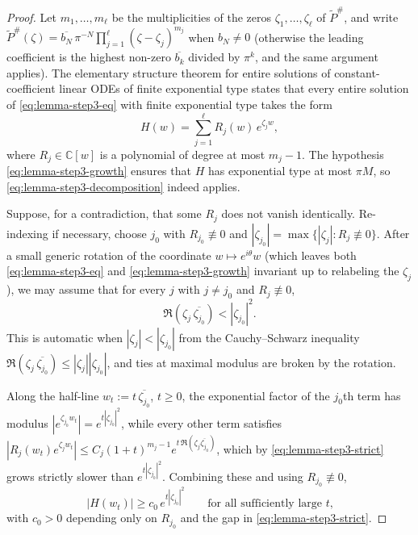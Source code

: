 \documentclass[a4paper,11pt,reqno]{amsart}
\numberwithin{equation}{section}
\theoremstyle{plain} %
\theoremstyle{definition} %
\theoremstyle{remark}
\newcommand{\C}{\mathbb{C}}
\begin{document}
\begin{proof}
Let $m_1,\dots,m_\ell$ be the multiplicities of the zeros
$\zeta_1,\dots,\zeta_\ell$ of $\widetilde P^\#$, and write
\(\widetilde P^\#(\zeta)=\overline{b_N}\,\pi^{-N}\prod_{j=1}^\ell(\zeta-\zeta_j)^{m_j}\)
when $b_N\neq0$ (otherwise the leading coefficient is the highest non-zero
$\overline{b_k}$ divided by $\pi^k$, and the same argument applies). The
elementary structure theorem for entire solutions of constant-coefficient
linear ODEs of finite exponential type \cite[Ch.~XII]{Hormander-PDE2} states that
every entire solution of \eqref{eq:lemma-step3-eq} with finite exponential
type takes the form
\begin{equation}\label{eq:lemma-step3-decomposition}
H(w)=\sum_{j=1}^\ell R_j(w)\,e^{\zeta_j w},
\end{equation}
where \(R_j\in\C[w]\) is a polynomial of degree at most \(m_j-1\). The
hypothesis \eqref{eq:lemma-step3-growth} ensures that \(H\) has exponential
type at most \(\pi M\), so \eqref{eq:lemma-step3-decomposition} indeed
applies.

Suppose, for a contradiction, that some $R_j$ does not vanish identically.
Re-indexing if necessary, choose $j_0$ with $R_{j_0}\not\equiv0$ and
$|\zeta_{j_0}|=\max\{|\zeta_j|\colon R_j\not\equiv 0\}$. After a small
generic rotation of the coordinate $w\mapsto e^{i\theta}w$ (which leaves both
\eqref{eq:lemma-step3-eq} and \eqref{eq:lemma-step3-growth} invariant up to
relabeling the $\zeta_j$), we may assume that for every \(j\) with
$j\ne j_0$ and $R_j\not\equiv 0$,
\begin{equation}\label{eq:lemma-step3-strict}
\Re(\zeta_j\,\overline{\zeta_{j_0}})<|\zeta_{j_0}|^2.
\end{equation}
This is automatic when $|\zeta_j|<|\zeta_{j_0}|$ from the Cauchy--Schwarz
inequality $\Re(\zeta_j\,\overline{\zeta_{j_0}})\le|\zeta_j||\zeta_{j_0}|$,
and ties at maximal modulus are broken by the rotation.

Along the half-line \(w_t:=t\,\overline{\zeta_{j_0}}\), \(t\ge 0\), the
exponential factor of the \(j_0\)th term has modulus
$|e^{\zeta_{j_0}w_t}|=e^{t|\zeta_{j_0}|^2}$, while every other term
satisfies
\(|R_j(w_t)e^{\zeta_j w_t}|\le C_j(1+t)^{m_j-1}e^{t\,\Re(\zeta_j\overline{\zeta_{j_0}})}\),
which by \eqref{eq:lemma-step3-strict} grows strictly slower than
$e^{t|\zeta_{j_0}|^2}$. Combining these and using $R_{j_0}\not\equiv 0$,
\begin{equation}\label{eq:lemma-step3-lower}
|H(w_t)|\ge c_0\,e^{t|\zeta_{j_0}|^2}
\qquad
\text{for all sufficiently large $t$,}
\end{equation}
with $c_0>0$ depending only on $R_{j_0}$ and the gap in
\eqref{eq:lemma-step3-strict}.


\end{proof}
\end{document}
